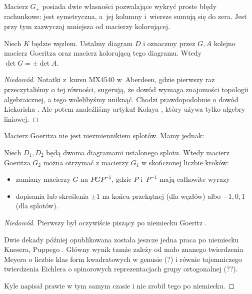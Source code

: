 Macierz $G_+$ posiada dwie własności pozwalające wykryć proste błędy rachunkowe: jest symetryczna, a~jej kolumny i~wiersze sumują się do zera.
Jest przy tym zazwyczaj mniejsza od macierzy kolorującej.

\begin{proposition}
    Niech $K$ będzie węzłem.
    Ustalmy diagram $D$ i oznaczmy przez $G, A$ kolejno macierz Goeritza oraz macierz kolorującą tego diagramu.
    Wtedy  $\det G = \pm \det A$.
\end{proposition}

\begin{proof}[Niedowód]
    Notatki z~kursu MX4540 w~Aberdeen, gdzie pierwszy raz przeczytaliśmy o tej równości, sugerują, że dowód wymaga znajomości topologii algebraicznej, a tego wolelibyśmy uniknąć.
    Chodzi prawdopodobnie o dowód Lickorisha \cite[s. 99]{lickorish97}.
    Ale potem znaleźliśmy artykuł Kolaya \cite{kolay19}, który używa tylko algebry liniowej.
\end{proof}    

Macierz Goeritza nie jest niezmiennikiem splotów.
Mamy jednak:

\begin{proposition}
    Niech $D_1, D_2$ będą dwoma diagramami ustalonego splotu.
    Wtedy macierz Goeritza $G_2$ można otrzymać z macierzy $G_1$ w skończonej liczbie kroków:
    \begin{itemize}
        \item zamiany macierzy $G$ na $PGP^{-1}$, gdzie $P$ i~$P^{-1}$ mają całkowite wyrazy
        \item dopisania lub skreślenia $\pm 1$ na końcu przekątnej (dla węzłów) albo $-1, 0, 1$ (dla splotów).
    \end{itemize}
\end{proposition}

\begin{proof}[Niedowód]
%
%
%
%
    Pierwszy był oczywiście piszący po niemiecku Goeritz \cite{goeritz33}.

    Dwie dekady później opublikowana została jeszcze jedna praca po niemiecku Knesera, Puppego \cite{kneser53}.
    Główny wynik tamże zależy od mało znanego twierdzenia Meyera o liczbie klas form kwadratowych w genusie (?) i równie tajemniczego twierdzenia Eichlera o spinorowych reprezentacjach grupy ortogonalnej (??).

    Kyle napisał prawie w tym samym czasie \cite{kyle54} i nie zrobił tego po niemiecku.
\end{proof}


